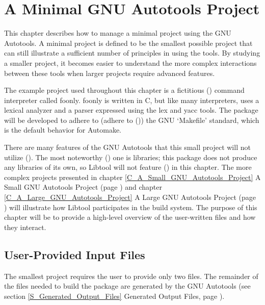 \chapter{A Minimal GNU Autotools Project}\label{C_amgap}


This chapter describes how to manage a minimal project using the GNU Autotools. A minimal project is defined to be the smallest possible project that can still illustrate a sufficient number of principles in using the tools. By studying a smaller project, it becomes easier to understand the more complex interactions between these tools when larger projects require advanced features. 


The example project used throughout this chapter is a fictitious ({\MiQ{}}) 
command interpreter called foonly. foonly is written in C, but like many 
interpreters, uses a lexical analyzer and a parser expressed using the lex 
and yacc tools. The package will be developed to adhere to (adhere to ({\MoQ{}}))
the GNU `Makefile' standard, which is the default behavior for Automake. 


There are many features of the GNU Autotools that this small project will not 
utilize ({\MaQ{}}). The most noteworthy ({\MdQ{}}) one is libraries; this 
package does not produce 
any libraries of its own, so Libtool will not feature ({\McQ{}}) in this 
chapter. The 
more complex projects presented in 
chapter \ref{C_A_Small_GNU_Autotools_Project} A 
Small GNU Autotools Project (page \pageref{C_A_Small_GNU_Autotools_Project}) and 
chapter \ref{C_A_Large_GNU_Autotools_Project} A Large GNU Autotools Project
(page \pageref{C_A_Large_GNU_Autotools_Project}) will 
illustrate how Libtool participates in the build system. The purpose of this chapter will be to provide a high-level overview of the user-written files and how they interact.

\section{User-Provided Input Files}


The smallest project requires the user to provide only two files. The 
remainder of the files needed to build the package are generated by the GNU 
Autotools (see section \ref{S_Generated_Output_Files} Generated Output Files,
page \pageref{S_Generated_Output_Files}). 

